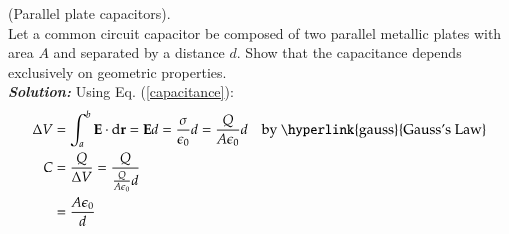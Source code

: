 \begin{ex}{(Parallel plate capacitors).\\}
	Let a common circuit capacitor be composed of two parallel metallic plates with area $A$ and separated by a distance $d$. Show that the capacitance depends exclusively on geometric properties.\\

	\textbf{\textit{Solution:}} Using Eq. (\ref{capacitance}):
	\begin{align*}
		\Delta V &= \int_{a}^{b} \mathbf{E} \cdot  \mathrm{d}\mathbf{r} = \mathbf{E} d = \frac{\sigma}{\epsilon_0}d = \frac{Q}{A\epsilon_0}d&\text{by \hyperlink{gauss}{Gauss's Law}}\\
		C &= \frac{Q}{\Delta V} = \frac{Q}{\frac{Q}{A\epsilon_0}d}\\
		  &= \frac{A\epsilon_0}{d}
	\end{align*}
\end{ex}
